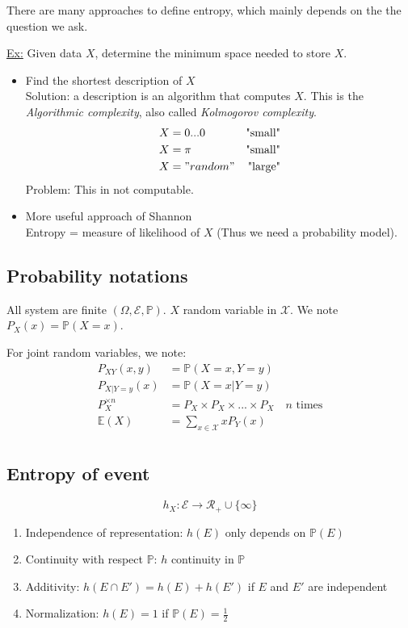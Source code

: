 There are many approaches to define entropy, which mainly depends on the the question we ask.

\underline{Ex:} Given data $X$, determine the minimum space needed to store $X$.

\begin{itemize}
\item Find the shortest description of $X$\\
Solution: a description is an algorithm that computes $X$.
This is the \textit{Algorithmic complexity}, also called \textit{Kolmogorov complexity}.
\begin{align*}
X & = 0 ... 0 & \text{"small"}\\
X & = \pi & \text{"small"}\\
X & = "random" & \text{"large"}\\
\end{align*}
Problem: This in not computable.
\item More useful approach of Shannon\\
Entropy = measure of likelihood of $X$ (Thus we need a probability model).
\end{itemize}

\subsection{Probability notations}
All system are finite $(\Omega, \mathcal{E}, \mathbb{P})$. $X$ random variable in $\mathcal{X}$. We note $P_X(x)=\mathbb{P}(X=x)$.

For joint random variables, we note:
\begin{align*}
P_{XY}(x,y) & =\mathbb{P}(X=x,Y=y)\\
P_{X|Y=y}(x) & =\mathbb{P}(X=x | Y=y)\\
P_X^{\times n}&= P_X \times P_X \times ... \times P_X \quad \text{$n$ times} \\
\mathbb{E}(X) & = \sum_{x\in \mathcal{X}} xP_Y(x)\\
\end{align*}

\subsection{Entropy of event}

\begin{equation*}
h_X: \mathcal{E} \to \mathcal{R}_+ \cup \{\infty\}
\end{equation*}

\begin{enumerate}
\item Independence of representation: $h(E)$ only depends on $\mathbb{P}(E)$
\item Continuity with respect $\mathbb{P}$: $h$ continuity in $\mathbb{P}$
\item Additivity: $h(E\cap E')=h(E) + h(E')$ if $E$ and $E'$ are independent
\item Normalization: $h(E)= 1$ if $ \mathbb{P}(E)=\frac{1}{2}$
\end{enumerate}

